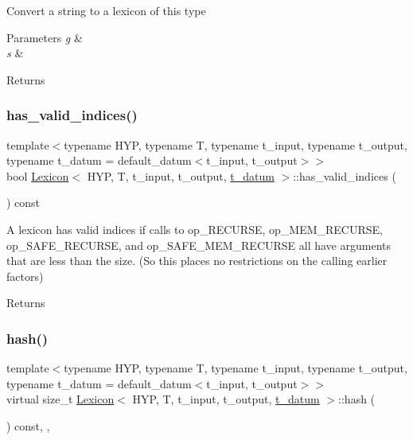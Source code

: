 Convert a string to a lexicon of this type 
\begin{DoxyParams}{Parameters}
{\em g} & \\
\hline
{\em s} & \\
\hline
\end{DoxyParams}
\begin{DoxyReturn}{Returns}

\end{DoxyReturn}
\mbox{\label{class_lexicon_a6d6b1b025ca707815a6776c3898503e4}} 
\subsubsection{\texorpdfstring{has\+\_\+valid\+\_\+indices()}{has\_valid\_indices()}}
{\footnotesize\ttfamily template$<$typename H\+YP, typename T, typename t\+\_\+input, typename t\+\_\+output, typename t\+\_\+datum = default\+\_\+datum$<$t\+\_\+input, t\+\_\+output$>$$>$ \\
bool \hyperlink{class_lexicon}{Lexicon}$<$ H\+YP, T, t\+\_\+input, t\+\_\+output, \hyperlink{class_bayesable_a7c93a2eeab708378eb321745908718d4}{t\+\_\+datum} $>$\+::has\+\_\+valid\+\_\+indices (\begin{DoxyParamCaption}{ }\end{DoxyParamCaption}) const\hspace{0.3cm}{\ttfamily [inline]}}

A lexicon has valid indices if calls to op\+\_\+\+R\+E\+C\+U\+R\+SE, op\+\_\+\+M\+E\+M\+\_\+\+R\+E\+C\+U\+R\+SE, op\+\_\+\+S\+A\+F\+E\+\_\+\+R\+E\+C\+U\+R\+SE, and op\+\_\+\+S\+A\+F\+E\+\_\+\+M\+E\+M\+\_\+\+R\+E\+C\+U\+R\+SE all have arguments that are less than the size. (So this places no restrictions on the calling earlier factors) \begin{DoxyReturn}{Returns}

\end{DoxyReturn}
\mbox{\label{class_lexicon_ab3180c29ad8ec74de2a89ce109226047}} 
\subsubsection{\texorpdfstring{hash()}{hash()}}
{\footnotesize\ttfamily template$<$typename H\+YP, typename T, typename t\+\_\+input, typename t\+\_\+output, typename t\+\_\+datum = default\+\_\+datum$<$t\+\_\+input, t\+\_\+output$>$$>$ \\
virtual size\+\_\+t \hyperlink{class_lexicon}{Lexicon}$<$ H\+YP, T, t\+\_\+input, t\+\_\+output, \hyperlink{class_bayesable_a7c93a2eeab708378eb321745908718d4}{t\+\_\+datum} $>$\+::hash (\begin{DoxyParamCaption}{ }\end{DoxyParamCaption}) const\hspace{0.3cm}{\ttfamily [inline]}, {\ttfamily [override]}, {\ttfamily [virtual]}}



